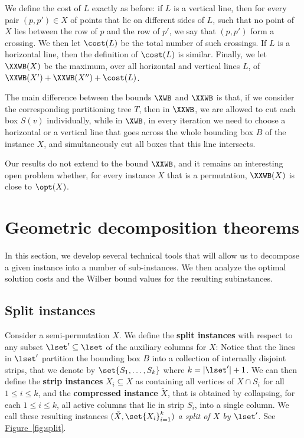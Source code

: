 \documentclass[11pt]{article}
\numberwithin{equation}{section}
\theoremstyle{definition}
\theoremstyle{plain}
\newcommand{\expref}[2]{\hyperref[#2]{#1~\ref{#2}}}
\begin{document}
We define the cost of $L$ exactly as before: if $L$ is a vertical line, then for every pair $(p,p')\in X$ of points that lie on different sides of $L$, such that no point of $X$ lies between the row of $p$ and the row of $p'$, we say that $(p,p')$ form a crossing. We then let $\cost(L)$ be the total number of such crossings. If $L$ is a horizontal line, then the definition of $\cost(L)$ is similar. Finally, we let $\XXWB(X)$ be the maximum, over all horizontal and vertical lines $L$, of $\XXWB(X')+\XXWB(X'')+\cost(L)$.

The main difference between the bounds $\XWB$ and $\XXWB$ is that, if we consider the corresponding partitioning tree $T$, then in $\XXWB$, we are allowed to cut each box $S(v)$ individually, while in $\XWB$, in every iteration we need to choose a horizontal or a vertical line that goes across the whole bounding box $B$ of the instance $X$, and simultaneously cut all boxes that this line intersects.

Our results do not extend to the bound $\XXWB$, and it remains an interesting open problem whether, for every instance $X$ that is a permutation, $\XXWB(X)$ is close to $\opt(X)$.
\fi 





%


%



\section{Geometric decomposition theorems} 
\label{sec: decomp}

In this section, we develop several technical tools that will allow us to decompose a given instance into a number of sub-instances. We then analyze the optimal solution costs and the Wilber bound values for the resulting subinstances.
%
%
%


\subsection{Split instances}
\label{sec:split instance} 

Consider a semi-permutation $X$. 
We  define the \textbf{split instances} with respect to any subset $\lset' \subseteq \lset$ of the auxiliary columns for $X$:
Notice that the lines in $\lset'$ partition the bounding box $B$ into a collection of internally disjoint strips, that we denote by $\set{S_1,\ldots,S_k}$ where $k = |\lset'|+1$.
We can then define the \textbf{strip instances} $X_i \subseteq X$ as containing all vertices of $X\cap S_i$ for all $1\leq i\leq k$, and the \textbf{compressed instance} $\tilde X$, that is obtained by collapsing, for each $1\leq i\leq k$, all active columns that lie in strip $S_i$, into a single column.
We  call these resulting instances $(\tilde{X}, \set{X_i}_{i=1}^{k})$  \emph{a split of $X$ by $\lset'$}. 
See \expref{Figure}{fig:split}. 
\end{document}
